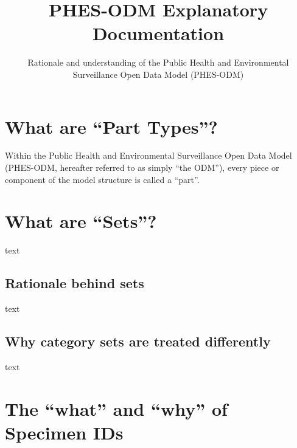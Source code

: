 \documentclass[
  letterpaper,
  DIV=11,
  numbers=noendperiod]{scrartcl}
\title{PHES-ODM Explanatory Documentation}
\subtitle{Rationale and understanding of the Public Health and
Environmental Surveillance Open Data Model (PHES-ODM)}
\author{}
\date{}
\renewcommand*\contentsname{Table of contents}
\newcommand\contentsname{Table of contents}
\begin{document}
\maketitle
\ifdefined\Shaded\renewenvironment{Shaded}{\begin{tcolorbox}[boxrule=0pt, interior hidden, borderline west={3pt}{0pt}{shadecolor}, sharp corners, breakable, enhanced, frame hidden]}{\end{tcolorbox}}\fi

\renewcommand*\contentsname{Table of Contents}
{
\hypersetup{linkcolor=}
\setcounter{tocdepth}{3}
\tableofcontents
}
\listoffigures
\listoftables
\hypertarget{what-are-part-types}{%
\section{What are ``Part Types''?}\label{what-are-part-types}}

Within the Public Health and Environmental Surveillance Open Data Model
(PHES-ODM, hereafter referred to as simply ``the ODM''), every piece or
component of the model structure is called a ``part''.

\hypertarget{what-are-sets}{%
\section{What are ``Sets''?}\label{what-are-sets}}

text

\hypertarget{rationale-behind-sets}{%
\subsection{Rationale behind sets}\label{rationale-behind-sets}}

text

\hypertarget{why-category-sets-are-treated-differently}{%
\subsection{Why category sets are treated
differently}\label{why-category-sets-are-treated-differently}}

text

\hypertarget{the-what-and-why-of-specimen-ids}{%
\section{The ``what'' and ``why'' of Specimen
IDs}\label{the-what-and-why-of-specimen-ids}}
\end{document}
